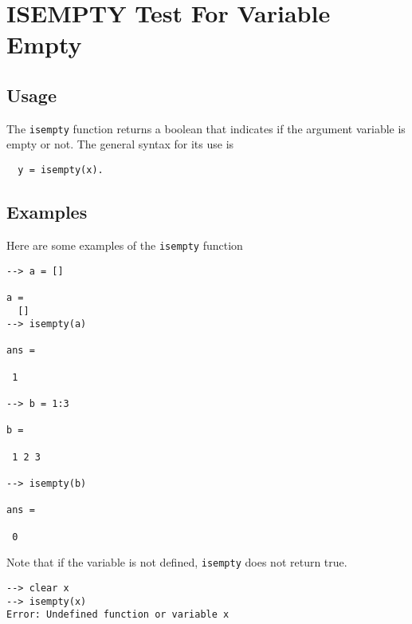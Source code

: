 \section{ISEMPTY Test For Variable Empty}

\subsection{Usage}

The \verb|isempty| function returns a boolean that indicates
if the argument variable is empty or not.  The general
syntax for its use is
\begin{verbatim}
  y = isempty(x).
\end{verbatim}
\subsection{Examples}

Here are some examples of the \verb|isempty| function
\begin{verbatim}
--> a = []

a = 
  []
--> isempty(a)

ans = 

 1 

--> b = 1:3

b = 

 1 2 3 

--> isempty(b)

ans = 

 0 
\end{verbatim}
Note that if the variable is not defined, \verb|isempty| 
does not return true.
\begin{verbatim}
--> clear x
--> isempty(x)
Error: Undefined function or variable x
\end{verbatim}
